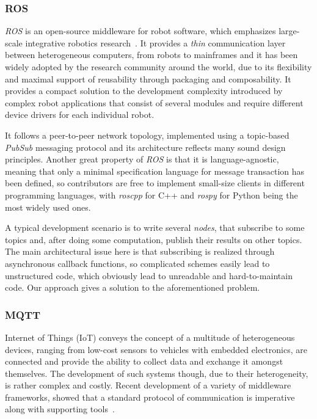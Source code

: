 \documentclass[sigplan,screen,review,anonymous]{acmart}
\begin{document}
\subsubsection{ROS}
\textit{ROS} is an open-source middleware for robot software, which emphasizes
large-scale integrative robotics research~\cite{ROS}. It provides a \textit{thin}
communication layer between heterogeneous computers, from robots to mainframes
and it has been widely adopted by the research community around the world, due
to its flexibility and maximal support of reusability through packaging and
composability. It provides a compact solution to the development complexity
introduced by complex robot applications that consist of several modules and
require different device drivers for each individual robot.

It follows a peer-to-peer network topology, implemented using a topic-based
\textit{PubSub} messaging protocol and its architecture reflects many sound
design principles. Another great property of \textit{ROS} is that it is
language-agnostic, meaning that only a minimal specification language for
message transaction has been defined, so contributors are free to implement
small-size clients in different programming languages, with \textit{roscpp} for C++
and \textit{rospy} for Python being the most widely used ones.

A typical development scenario is to write several \textit{nodes}, that
subscribe to some topics and, after doing some computation, publish their
results on other topics. The main architectural issue here is that subscribing
is realized through asynchronous callback functions, so complicated schemes
easily lead to unstructured code, which obviously lead to unreadable and
hard-to-maintain code. Our approach gives a solution to the aforementioned
problem.

\subsubsection{MQTT}
Internet of Things (IoT) conveys the concept of a multitude of heterogeneous devices,
ranging from low-cost sensors to vehicles with embedded electronics, are connected and
provide the ability to collect data and exchange it amongst themselves.
The development of such systems though, due to their heterogeneity, is rather
complex and costly. Recent development of a variety of middleware frameworks,
showed that a standard protocol of communication is imperative along with supporting
tools~\cite{iot_middleware}.
\end{document}
